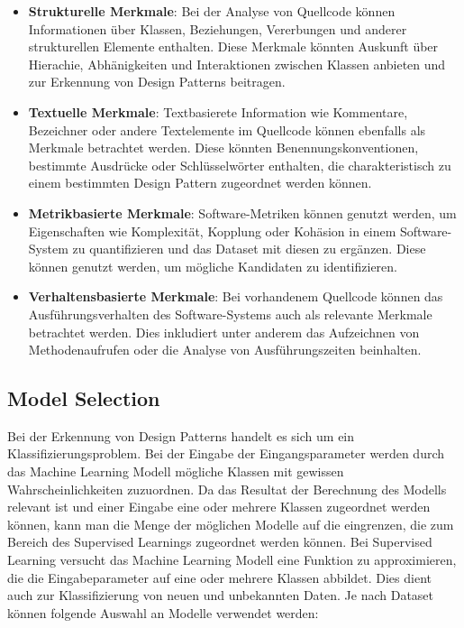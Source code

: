 \documentclass[conference]{IEEEtran}
\begin{document}
\begin{itemize}
    \item \textbf{Strukturelle Merkmale}: Bei der Analyse von Quellcode können Informationen über Klassen, Beziehungen, Vererbungen und anderer strukturellen Elemente enthalten. Diese Merkmale könnten Auskunft über Hierachie, Abhänigkeiten und Interaktionen zwischen Klassen anbieten und zur Erkennung von Design Patterns beitragen.
    \item \textbf{Textuelle Merkmale}: Textbasierete Information wie Kommentare, Bezeichner oder andere Textelemente im Quellcode können ebenfalls als Merkmale betrachtet werden. Diese könnten Benennungskonventionen, bestimmte Ausdrücke oder Schlüsselwörter enthalten, die charakteristisch zu einem bestimmten Design Pattern zugeordnet werden können.
    \item \textbf{Metrikbasierte Merkmale}: Software-Metriken können genutzt werden, um Eigenschaften wie Komplexität, Kopplung oder Kohäsion in einem Software-System zu quantifizieren und das Dataset mit diesen zu ergänzen. Diese können genutzt werden, um mögliche Kandidaten zu identifizieren.
    \item \textbf{Verhaltensbasierte Merkmale}: Bei vorhandenem Quellcode können das Ausführungsverhalten des Software-Systems auch als relevante Merkmale betrachtet werden. Dies inkludiert unter anderem das Aufzeichnen von Methodenaufrufen oder die Analyse von Ausführungszeiten beinhalten.
\end{itemize}


\subsection{Model Selection}

Bei der Erkennung von Design Patterns handelt es sich um ein Klassifizierungsproblem. Bei der Eingabe der Eingangsparameter werden durch das Machine Learning Modell mögliche Klassen mit gewissen Wahrscheinlichkeiten zuzuordnen.
Da das Resultat der Berechnung des Modells relevant ist und einer Eingabe eine oder mehrere Klassen zugeordnet werden können, kann man die Menge der möglichen Modelle auf die eingrenzen, die zum Bereich des Supervised Learnings zugeordnet werden können.
Bei Supervised Learning versucht das Machine Learning Modell eine Funktion zu approximieren, die die Eingabeparameter auf eine oder mehrere Klassen abbildet. Dies dient auch zur Klassifizierung von neuen und unbekannten Daten.
Je nach Dataset können folgende Auswahl an Modelle verwendet werden:
\end{document}
